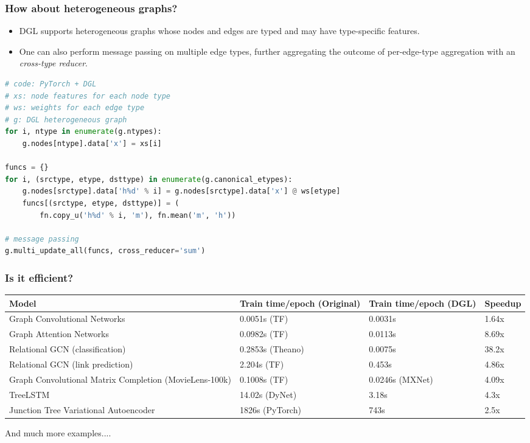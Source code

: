 \documentclass[10pt,aspectratio=169]{beamer}
\begin{document}
	\begin{frame}[fragile]
		\frametitle{How about heterogeneous graphs?}
		\begin{itemize}
			\item DGL supports heterogeneous graphs whose nodes and edges are typed and may have type-specific features.
			\item One can also perform message passing on multiple edge types, further aggregating the outcome of per-edge-type aggregation with an \emph{cross-type reducer}.
		\end{itemize}
		\begin{center}
			\centering
			\begin{minipage}{0.7\textwidth}
\begin{lstlisting}[language=Python]
# code: PyTorch + DGL
# xs: node features for each node type
# ws: weights for each edge type
# g: DGL heterogeneous graph
for i, ntype in enumerate(g.ntypes):
    g.nodes[ntype].data['x'] = xs[i]

funcs = {}
for i, (srctype, etype, dsttype) in enumerate(g.canonical_etypes):
    g.nodes[srctype].data['h%d' % i] = g.nodes[srctype].data['x'] @ ws[etype]
    funcs[(srctype, etype, dsttype)] = (
        fn.copy_u('h%d' % i, 'm'), fn.mean('m', 'h'))

# message passing
g.multi_update_all(funcs, cross_reducer='sum')
\end{lstlisting}
			\end{minipage}
		\end{center}
	\end{frame}

	\begin{frame}
		\frametitle{Is it efficient?}
		\begin{center}
			\centering
			\begin{tabular}{|p{}p{0.2\textwidth}p{}p{}|}
				\hline
				Model & Train time/epoch (Original) & Train time/epoch (DGL) & Speedup \\
				\hline
				Graph Convolutional Networks & 0.0051s (TF) & 0.0031s & 1.64x \\
				\hline
				Graph Attention Networks & 0.0982s (TF) & 0.0113s & 8.69x \\
				\hline
				Relational GCN (classification) & 0.2853s (Theano) & 0.0075s & 38.2x \\
				\hline
				Relational GCN (link prediction) & 2.204s (TF) & 0.453s & 4.86x \\
				\hline
				Graph Convolutional Matrix Completion (MovieLens-100k) & 0.1008s (TF) & 0.0246s (MXNet) & 4.09x \\
				\hline
				TreeLSTM & 14.02s (DyNet) & 3.18s & 4.3x \\
				\hline
				Junction Tree Variational Autoencoder & 1826s (PyTorch) & 743s & 2.5x \\
				\hline
			\end{tabular}
			And much more examples....
		\end{center}
	\end{frame}
\end{document}
